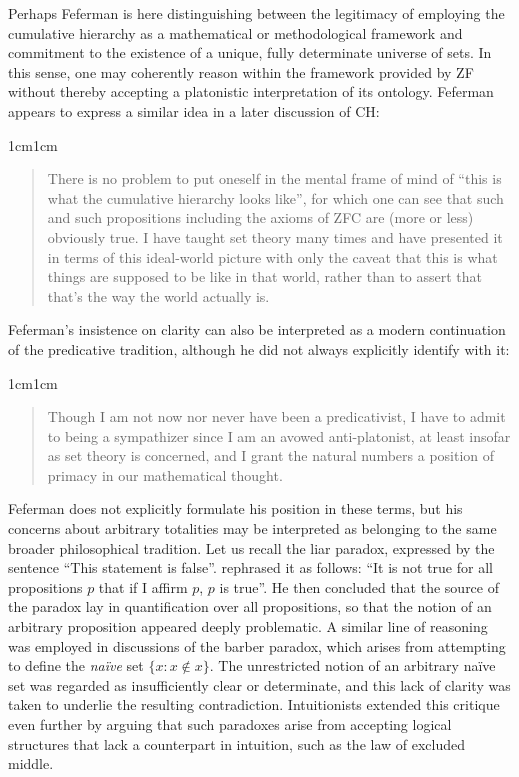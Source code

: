 \documentclass[11pt,a4paper]{article}
\theoremstyle{plain}
\begin{document}
Perhaps Feferman is here distinguishing between the legitimacy of employing the cumulative hierarchy as a mathematical or methodological framework and commitment to the existence of a unique, fully determinate universe of sets. In this sense, one may coherently reason within the framework provided by ZF without thereby accepting a platonistic interpretation of its ontology. Feferman appears to express a similar idea in a later discussion of CH:

\begin{adjustwidth}{1cm}{1cm}
\begin{quote}
\small
There is no problem to put oneself in the mental frame of mind of “this is what the cumulative hierarchy looks like”, for which one can see that such and such propositions including the axioms of ZFC are (more or less) obviously true. I have taught set theory many times and have presented it in terms of this ideal-world picture with only the caveat that this is what things are supposed to be like in that world, rather than to assert that that's the way the world actually is. \parencite[19]{Feferman2011a}
\end{quote}
\end{adjustwidth}

Feferman's insistence on clarity can also be interpreted as a modern continuation of the predicative tradition, although he did not always explicitly identify with it:

\begin{adjustwidth}{1cm}{1cm}
\begin{quote}
\small
Though I am not now nor never have been a predicativist, I have to admit to being a sympathizer since I am an avowed anti-platonist, at least insofar as set theory is concerned, and I grant the natural numbers a position of primacy in our mathematical thought. \parencite[313]{Feferman2004a}
\end{quote}
\end{adjustwidth}

Feferman does not explicitly formulate his position in these terms, but his concerns about arbitrary totalities may be interpreted as belonging to the same broader philosophical tradition. Let us recall the liar paradox, expressed by the sentence ``This statement is false''. \textcite[224]{Russell1908} rephrased it as follows: ``It is not true for all propositions $p$ that if I affirm $p$, $p$ is true''. He then concluded that the source of the paradox lay in quantification over all propositions, so that the notion of an arbitrary proposition appeared deeply problematic. A similar line of reasoning was employed in discussions of the barber paradox, which arises from attempting to define the \emph{naïve} set $\{x : x \notin x\}$. The unrestricted notion of an arbitrary naïve set was regarded as insufficiently clear or determinate, and this lack of clarity was taken to underlie the resulting contradiction. Intuitionists extended this critique even further by arguing that such paradoxes arise from accepting logical structures that lack a counterpart in intuition, such as the law of excluded middle.
\end{document}
